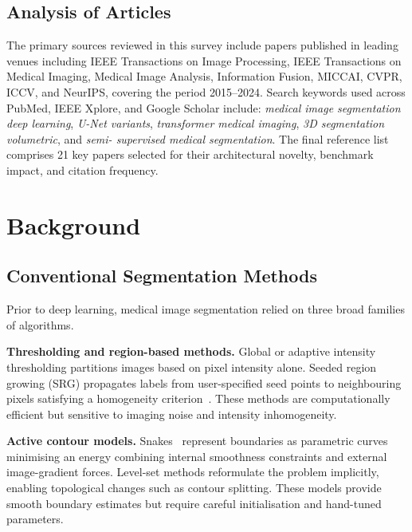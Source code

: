 \documentclass[preprint,12pt,authoryear]{elsarticle}
\begin{document}
\subsection{Analysis of Articles}
\label{sec:articles}

The primary sources reviewed in this survey include papers published in leading
venues including IEEE Transactions on Image Processing, IEEE Transactions on
Medical Imaging, Medical Image Analysis, Information Fusion, MICCAI, CVPR,
ICCV, and NeurIPS, covering the period 2015--2024. Search keywords used across
PubMed, IEEE Xplore, and Google Scholar include: \textit{medical image
segmentation deep learning}, \textit{U-Net variants}, \textit{transformer
medical imaging}, \textit{3D segmentation volumetric}, and \textit{semi-
supervised medical segmentation}. The final reference list comprises 21 key
papers selected for their architectural novelty, benchmark impact, and
citation frequency.

\section{Background}
\label{sec:background}

\subsection{Conventional Segmentation Methods}
\label{sec:conventional}

Prior to deep learning, medical image segmentation relied on three broad
families of algorithms.

\textbf{Thresholding and region-based methods.} Global or adaptive intensity
thresholding partitions images based on pixel intensity alone. Seeded region
growing (SRG) propagates labels from user-specified seed points to neighbouring
pixels satisfying a homogeneity criterion~\citep{qureshi2023review}. These
methods are computationally efficient but sensitive to imaging noise and
intensity inhomogeneity.

\textbf{Active contour models.} Snakes~\citep{kass1988snakes} represent
boundaries as parametric curves minimising an energy combining internal
smoothness constraints and external image-gradient forces. Level-set methods
reformulate the problem implicitly, enabling topological changes such as contour
splitting. These models provide smooth boundary estimates but require careful
initialisation and hand-tuned parameters.
\end{document}
